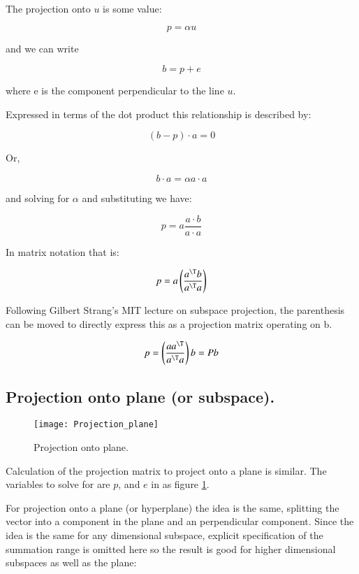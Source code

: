 The projection onto $u$ is some value:

\[
p = \alpha u
\]

and we can write

\[
b = p + e
\]

where e is the component perpendicular to the line $u$.

Expressed in terms of the dot product this relationship is described by:

\[
(b - p) \cdot a = 0
\]

Or, 

\[
b \cdot a = \alpha a \cdot a
\]

and solving for $\alpha$ and substituting we have:

\begin{equation}
p = a \frac{a \cdot b}{a \cdot a}
\end{equation}

In matrix notation that is:

\begin{equation}
p = a \left(\frac{a^\T b}{a^\T a} \right)
\end{equation}

Following Gilbert Strang's MIT lecture on subspace projection, the parenthesis can be moved to directly express this as a projection matrix operating on b.

\begin{equation}\label{eqn:projMatrixCompare:projectmatrixline}
p = \left(\frac{a a^\T}{a^\T a}\right) b = P b
\end{equation}


\subsection{Projection onto plane (or subspace). }



\begin{figure}[htp]
\centering
\texttt{[image: Projection\_plane]}
\caption{Projection onto plane.}\label{fig:Projection_plane}
\end{figure}

Calculation of the projection matrix to project onto a plane is similar.  The variables to solve for are $p$, and $e$ in as
figure \ref{fig:Projection_plane}.

For projection onto a plane (or hyperplane) the idea is the same, splitting the vector into a component in the plane and an perpendicular component.
Since the
idea is the same for any dimensional subspace, explicit specification of the summation range is omitted here so the result is good for higher dimensional
subspaces as well as the plane:

